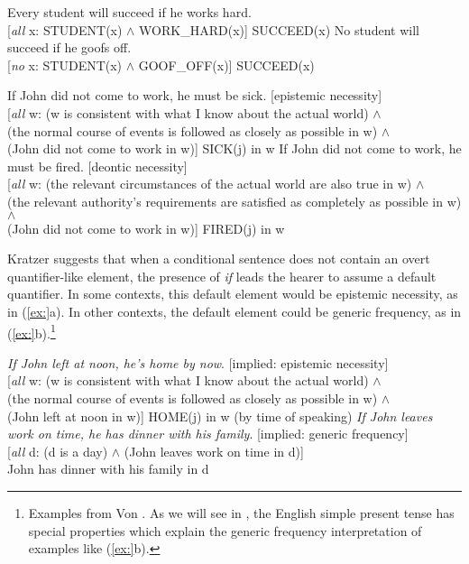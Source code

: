 \ea
\ea  Every student will succeed if he works hard.\\
{}[\textit{all} x: STUDENT(x) $\wedge$ WORK\_HARD(x)] SUCCEED(x)
\ex  No student will succeed if he goofs off.\\
{}[\textit{no} x: STUDENT(x) $\wedge$ GOOF\_OFF(x)] SUCCEED(x)
\z \z

\ea
\ea  If John did not come to work, he must be sick.  [epistemic necessity]\\
  {}[\textit{all} w: (w is consistent with what I know about the actual world) $\wedge$\\
  (the normal course of events is followed as closely as possible in w) $\wedge$\\
  (John did not come to work in w)] SICK(j) in w
\ex  If John did not come to work, he must be fired.  [deontic necessity]\\
  {}[\textit{all} w: (the relevant circumstances of the actual world are also true in w) $\wedge$\\
  (the relevant authority’s requirements are satisfied as completely as possible in w) $\wedge$\\
  (John did not come to work in w)] FIRED(j) in w
\z \z


Kratzer suggests that when a conditional sentence does not contain an overt quantifier-like element, the presence of \textit{if} leads the hearer to assume a default quantifier. In some contexts, this default element would be epistemic necessity, as in (\ref{ex:}a). In other contexts, the default element could be generic frequency, as in (\ref{ex:}b).\footnote{Examples from Von \citet{Fintel2011}. As we will see in , the English simple present tense has special properties which explain the generic frequency interpretation of examples like (\ref{ex:}b).}


\ea
\ea \textit{If John left at noon, he’s home by now}.   [implied: epistemic necessity]\\
  {}[\textit{all} w: (w is consistent with what I know about the actual world) $\wedge$\\
  (the normal course of events is followed as closely as possible in w) $\wedge$\\
  (John left at noon in w)] HOME(j) in w (by time of speaking)
\ex \textit{If John leaves work on time, he has dinner with his family}. [implied: generic frequency]\\
  {}[\textit{all} d: (d is a day) $\wedge$ (John leaves work on time in d)]\\
    John has dinner with his family in d
\z \z


